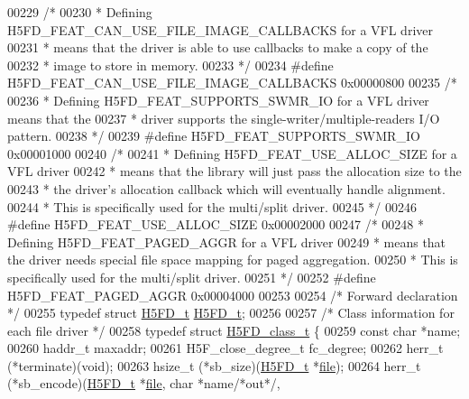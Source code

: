 \begin{DoxyCode}
00229     \textcolor{comment}{/*}
00230 \textcolor{comment}{     * Defining H5FD\_FEAT\_CAN\_USE\_FILE\_IMAGE\_CALLBACKS for a VFL driver}
00231 \textcolor{comment}{     * means that the driver is able to use callbacks to make a copy of the}
00232 \textcolor{comment}{     * image to store in memory.}
00233 \textcolor{comment}{     */}
00234 \textcolor{preprocessor}{#define H5FD\_FEAT\_CAN\_USE\_FILE\_IMAGE\_CALLBACKS 0x00000800}
00235     \textcolor{comment}{/*}
00236 \textcolor{comment}{     * Defining H5FD\_FEAT\_SUPPORTS\_SWMR\_IO for a VFL driver means that the}
00237 \textcolor{comment}{     * driver supports the single-writer/multiple-readers I/O pattern.}
00238 \textcolor{comment}{     */}
00239 \textcolor{preprocessor}{#define H5FD\_FEAT\_SUPPORTS\_SWMR\_IO      0x00001000}
00240     \textcolor{comment}{/*}
00241 \textcolor{comment}{     * Defining H5FD\_FEAT\_USE\_ALLOC\_SIZE for a VFL driver}
00242 \textcolor{comment}{     * means that the library will just pass the allocation size to the}
00243 \textcolor{comment}{     * the driver's allocation callback which will eventually handle alignment.}
00244 \textcolor{comment}{     * This is specifically used for the multi/split driver.}
00245 \textcolor{comment}{     */}
00246 \textcolor{preprocessor}{#define H5FD\_FEAT\_USE\_ALLOC\_SIZE    0x00002000}
00247     \textcolor{comment}{/*}
00248 \textcolor{comment}{     * Defining H5FD\_FEAT\_PAGED\_AGGR for a VFL driver}
00249 \textcolor{comment}{     * means that the driver needs special file space mapping for paged aggregation.}
00250 \textcolor{comment}{     * This is specifically used for the multi/split driver.}
00251 \textcolor{comment}{     */}
00252 \textcolor{preprocessor}{#define H5FD\_FEAT\_PAGED\_AGGR        0x00004000}
00253 
00254 \textcolor{comment}{/* Forward declaration */}
00255 \textcolor{keyword}{typedef} \textcolor{keyword}{struct }\hyperlink{struct_h5_f_d__t}{H5FD\_t} \hyperlink{struct_h5_f_d__t}{H5FD\_t};
00256 
00257 \textcolor{comment}{/* Class information for each file driver */}
00258 \textcolor{keyword}{typedef} \textcolor{keyword}{struct }\hyperlink{struct_h5_f_d__class__t}{H5FD\_class\_t} \{
00259     \textcolor{keyword}{const} \textcolor{keywordtype}{char} *name;
00260     haddr\_t maxaddr;
00261     H5F\_close\_degree\_t fc\_degree;
00262     herr\_t  (*terminate)(void);
00263     hsize\_t (*sb\_size)(\hyperlink{struct_h5_f_d__t}{H5FD\_t} *\hyperlink{structfile}{file});
00264     herr\_t  (*sb\_encode)(\hyperlink{struct_h5_f_d__t}{H5FD\_t} *\hyperlink{structfile}{file}, \textcolor{keywordtype}{char} *name\textcolor{comment}{/*out*/},

\end{DoxyCode}
